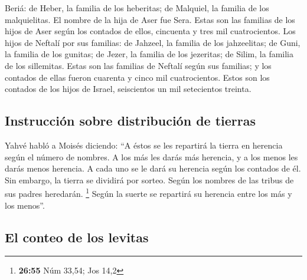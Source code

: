 Beriá: de Heber, la familia de los heberitas; de Malquiel, la familia de
los malquielitas.  El nombre de la hija de Aser fue Sera.
 Estas son las familias de los hijos de Aser según los
contados de ellos, cincuenta y tres mil cuatrocientos. 
Los hijos de Neftalí por sus familias: de Jahzeel, la familia de los
jahzeelitas; de Guni, la familia de los gunitas;  de
Jezer, la familia de los jezeritas; de Silim, la familia de los
sillemitas.  Estas son las familias de Neftalí según sus
familias; y los contados de ellas fueron cuarenta y cinco mil
cuatrocientos.  Estos son los contados de los hijos de
Israel, seiscientos un mil setecientos treinta.

\hypertarget{instrucciuxf3n-sobre-distribuciuxf3n-de-tierras}{%
\subsection{Instrucción sobre distribución de
tierras}\label{instrucciuxf3n-sobre-distribuciuxf3n-de-tierras}}

 Yahvé habló a Moisés diciendo:  ``A éstos
se les repartirá la tierra en herencia según el número de nombres.
 A los más les darás más herencia, y a los menos les
darás menos herencia. A cada uno se le dará su herencia según los
contados de él.  Sin embargo, la tierra se dividirá por
sorteo. Según los nombres de las tribus de sus padres heredarán.
\footnote{\textbf{26:55} Núm 33,54; Jos 14,2}  Según la
suerte se repartirá su herencia entre los más y los menos''.

\hypertarget{el-conteo-de-los-levitas}{%
\subsection{El conteo de los levitas}\label{el-conteo-de-los-levitas}}

